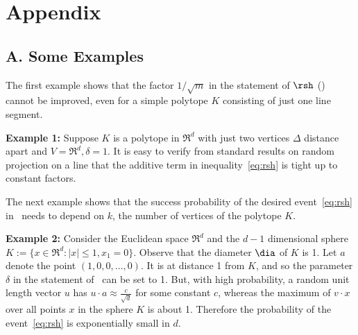 \appendix
\section*{Appendix}
\subsection*{{\bf A.} Some Examples}
\label{sec:examples}
The first example shows that the factor $1/\sqrt{m}$ in the statement of $\rsh$ () cannot be improved, even for a simple polytope $K$ consisting of just one line segment. 

\vspace*{0.1 in}
\noindent
{\bf Example 1:} Suppose  $K$  is a polytope in $\Re^d$ with just two vertices $\Delta$ distance apart and $V = \Re^d, \delta=1$. It is easy to verify from standard results on random projection on a line that the additive term in inequality~\eqref{eq:rsh} is tight up to constant factors.

\vspace*{0.1 in}
The next example shows that the success probability of the desired event~\eqref{eq:rsh} in~ needs to depend on $k$, the number of vertices of the polytope $K$. 

\vspace*{0.1 in}
\noindent
{\bf Example 2:} Consider the Euclidean space $\Re^d$ and the $d-1$ dimensional sphere $K:=\{x \in \Re^d: |x|\leq 1, x_1=0\}$. Observe that the diameter $\dia$ of $K$ is 1. 
Let $a$ denote the point $(1,0,0,\ldots ,0)$. It is at distance 1 from $K$, and so the parameter $\delta$ in the statement of~ can be set to 1.  But, with high probability,  a random unit length vector $u$ has $u\cdot a\approx \frac{c}{\sqrt d}$ for some constant $c$,  whereas the maximum of  $v\cdot x$ over all points $x$ in the sphere $K$ is about 1. Therefore the probability of the event~\eqref{eq:rsh} is exponentially small in $d$.